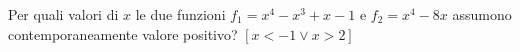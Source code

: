 
\begin{esercizio}[\Ast]
 \label{ese:4.83}
Per quali valori di \( x \) le due funzioni \(f_1=x^4-x^3+x-1\) e \(f_2=x^4-8x\) 
assumono contemporaneamente valore positivo? \hfill \(\left[x<-1\vee x>2\right]\)
\end{esercizio}
